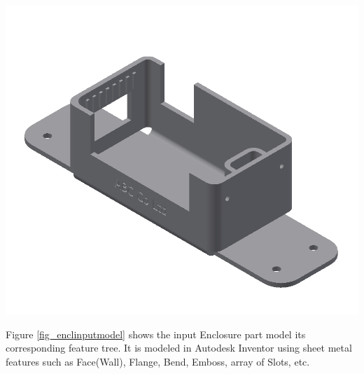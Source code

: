 \begin{minipage}{\linewidth}
\begin{minipage}[c]{0.62\linewidth}
\includegraphics[width=\linewidth,valign=t]{../Common/images/SheetMetal_Medium_Enclosure_OriginalPart}
 \label{fig_enclinputmodel}

\bigskip

 Figure \ref{fig_enclinputmodel} shows the input Enclosure part model its corresponding feature tree. It is modeled in Autodesk Inventor using sheet metal features such as Face(Wall), Flange, Bend, Emboss, array of Slots, etc. 
 

\end{minipage}
\end{minipage}
